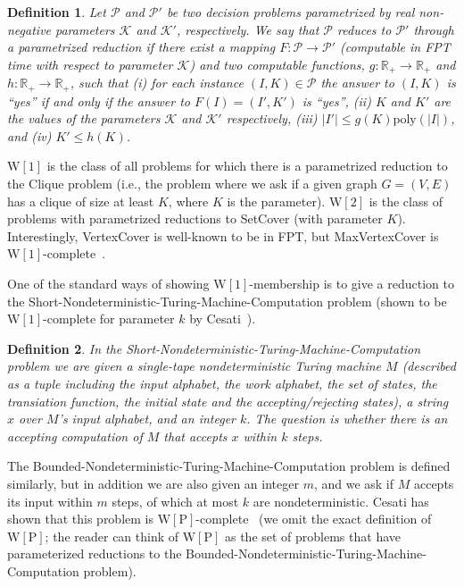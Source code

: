 \documentclass[11pt]{article}
\newcommand{\reals}{{{\mathbb{R}}}}
\newcommand{\poly}{{\mathrm{poly}}}
\newtheorem{definition}{Definition}
\newcommand{\wone}{{\mathrm{W[1]}}}
\newcommand{\wtwo}{{\mathrm{W[2]}}}
\newcommand{\wpclass}{{\mathrm{W[P]}}}
\begin{document}
\begin{definition}
  Let $\mathcal{P}$ and $\mathcal{P}'$ be two decision problems
  parametrized by real non-negative parameters $\mathcal{K}$ and
  $\mathcal{K}'$, respectively. We say that $\mathcal{P}$ reduces to
  $\mathcal{P}'$ through a parametrized reduction if there exist a
  mapping $F \colon \mathcal{P} \rightarrow \mathcal{P}'$ (computable
  in FPT time with respect to parameter $\mathcal{K}$) and two
  computable functions, $g \colon \reals_{+} \rightarrow \reals_{+}$
  and $h: \reals_{+} \rightarrow \reals_{+}$, such that (i) for each
  instance $(I, K) \in \mathcal{P}$ the answer to $(I, K)$ is ``yes''
  if and only if the answer to $F(I) = (I', K')$ is ``yes'', (ii) $K$
  and $K'$ are the values of the parameters $\mathcal{K}$ and
  $\mathcal{K}'$ respectively, (iii) $|I'| \leq g(K)\poly(|I|)$,
  and (iv) $K' \leq h(K)$.
\end{definition}

$\wone$ is the class of all problems for which there is a parametrized
reduction to the Clique problem (i.e., the problem where we ask if a
given graph $G = (V,E)$ has a clique of size at least $K$, where $K$
is the parameter). $\wtwo$ is the class of problems with parametrized
reductions to SetCover (with parameter $K$).  Interestingly,
VertexCover is well-known to be in FPT, but MaxVertexCover is
$\wone$-complete~\cite{guo-nie-wer:j:vertex-cover-variants}.

One of the standard ways of showing $\wone$-membership is to give a
reduction to the
Short-Non\-de\-ter\-ministic-Turing-Machi\-ne-Com\-putation problem
(shown to be $\wone$-complete for parameter $k$ by
Cesati~\cite{ces:j:turing-way-parameterized-complexity}).

\begin{definition}
  In the Short-Non\-de\-ter\-ministic-Turing-Machi\-ne-Com\-putation
  problem we are given a single-tape nondeterministic Turing machine
  $M$ (described as a tuple including the input alphabet, the work
  alphabet, the set of states, the transiation function, the initial
  state and the accepting/rejecting states), a string $x$ over $M$'s
  input alphabet, and an integer $k$. The question is whether there is
  an accepting computation of $M$ that accepts $x$ within $k$ steps.
\end{definition}


The Bounded-Non\-de\-ter\-ministic-Turing-Machi\-ne-Com\-putation
problem is defined similarly, but in addition we are also given an
integer $m$, and we ask if $M$ accepts its input within $m$ steps, of
which at most $k$ are nondeterministic. Cesati has shown that this
problem is
$\wpclass$-complete~\cite{ces:j:turing-way-parameterized-complexity}
(we omit the exact definition of $\wpclass$; the reader can think of
$\wpclass$ as the set of problems that have parameterized reductions
to the Bounded-Non\-de\-ter\-ministic-Turing-Machi\-ne-Com\-putation
problem).
\end{document}
